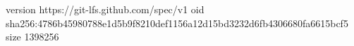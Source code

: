 version https://git-lfs.github.com/spec/v1
oid sha256:4786b45980788e1d5b9f8210def1156a12d15bd3232d6fb4306680fa6615bcf5
size 1398256
